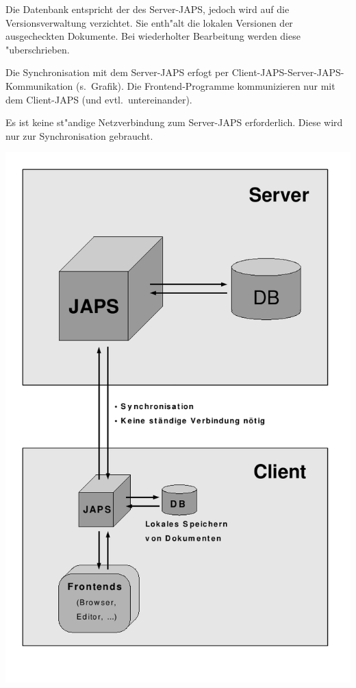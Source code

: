 \documentclass[a4paper,12pt]{article}
\begin{document}
Die Datenbank entspricht der des Server-JAPS, jedoch wird auf die
Versionsverwaltung verzichtet. Sie enth"alt die lokalen Versionen der ausgecheckten
Dokumente. Bei wiederholter Bearbeitung werden diese "uberschrieben.

Die Synchronisation mit dem Server-JAPS erfogt per Client-JAPS-Server-JAPS-Kommunikation
(s.\ Grafik). Die Frontend-Programme kommunizieren nur mit dem Client-JAPS (und evtl.\
untereinander).

Es ist keine st"andige Netzverbindung zum Server-JAPS erforderlich. Diese wird nur zur
Synchronisation gebraucht.

\includegraphics{authers_dev_env.pdf}
\end{document}
